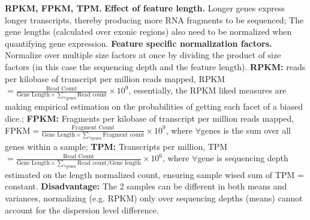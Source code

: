 \vspace{0.1em}\noindent
\textbf{RPKM, FPKM, TPM.} \textbf{Effect of feature length.} Longer genes express longer transcripts, thereby producing more RNA fragments to be sequenced; The gene lengths (calculated over exonic regions) also need to be normalized when quantifying gene expression. \textbf{Feature specific normalization factors.} Normalize over multiple size factors at once by dividing the product of size factors (in this case the sequencing depth and the feature length). \textbf{RPKM:} reads per kilobase of transcript per million reads mapped, RPKM$=\frac{\text{Read Count}}{\text{Gene Length}\times\sum_{\forall \text{genes}}\text{Read count}}\times10^9$, essentially, the RPKM liked measures are making empirical estimation on the probabilities of getting each facet of a biased dice.; \textbf{FPKM:} Fragments per kilobase of transcript per million reads mapped, FPKM$=\frac{\text{Fragment Count}}{\text{Gene Length}\times\sum_{\forall \text{genes}}\text{Fragment count}}\times10^9$, where $\forall$genes is the sum over all genes within a sample; \textbf{TPM:} Transcripts per million, TPM$=\frac{\text{Read Count}}{\text{Gene Length}\times\sum_{\forall \text{genes}}\text{Read count/Gene length}}\times10^6$, where $\forall$gene is sequencing depth estimated on the length normalized count, ensuring sample wised sum of TPM = constant. \textbf{Disadvantage:} The 2 samples can be different in both means and variances, normalizing (e.g. RPKM) only over sequencing depths (means) cannot account for the dispersion level difference.

